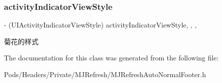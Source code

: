 \subsubsection{\texorpdfstring{activity\+Indicator\+View\+Style}{activityIndicatorViewStyle}}
{\footnotesize\ttfamily -\/ (U\+I\+Activity\+Indicator\+View\+Style) activity\+Indicator\+View\+Style\hspace{0.3cm}{\ttfamily [read]}, {\ttfamily [write]}, {\ttfamily [nonatomic]}, {\ttfamily [assign]}}

菊花的样式 

The documentation for this class was generated from the following file\+:\begin{DoxyCompactItemize}
\item 
Pods/\+Headers/\+Private/\+M\+J\+Refresh/M\+J\+Refresh\+Auto\+Normal\+Footer.\+h\end{DoxyCompactItemize}
